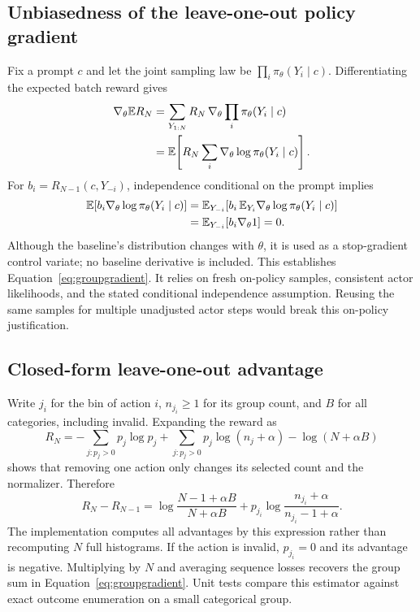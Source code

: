 \subsection{Unbiasedness of the leave-one-out policy gradient}
Fix a prompt $c$ and let the joint sampling law be
$\prod_i\pi_\theta(Y_i\mid c)$. Differentiating the expected batch reward
gives
\begin{align}
 \nabla_\theta\mathbb{E} R_N
 &=\sum_{Y_{1:N}} R_N\,
   \nabla_\theta\prod_i\pi_\theta(Y_i\mid c)\\
 &=\mathbb{E}\!\left[R_N\sum_i\nabla_\theta\log\pi_\theta(Y_i\mid c)\right].
\end{align}
For $b_i=R_{N-1}(c,Y_{-i})$, independence conditional on the prompt implies
\begin{align}
 \mathbb{E}[b_i\nabla_\theta\log\pi_\theta(Y_i\mid c)]
 &=\mathbb{E}_{Y_{-i}}\!\left[b_i\,
       \mathbb{E}_{Y_i}\nabla_\theta\log\pi_\theta(Y_i\mid c)\right]\\
 &=\mathbb{E}_{Y_{-i}}[b_i\nabla_\theta 1]=0.
\end{align}
Although the baseline's distribution changes with $\theta$, it is used as
a stop-gradient control variate; no baseline derivative is included.
This establishes Equation~\eqref{eq:groupgradient}. It relies on fresh
on-policy samples, consistent actor likelihoods, and the stated
conditional independence assumption. Reusing the same samples for multiple
unadjusted actor steps would break this on-policy justification.

\subsection{Closed-form leave-one-out advantage}
Write $j_i$ for the bin of action $i$, $n_{j_i}\geq1$ for its group count,
and $B$ for all categories, including invalid. Expanding the reward as
\begin{equation}
 R_N=-\sum_{j:p_j>0}p_j\log p_j
       +\sum_{j:p_j>0}p_j\log(n_j+\alpha)-\log(N+\alpha B)
\end{equation}
shows that removing one action only changes its selected count and the
normalizer. Therefore
\begin{equation}
 R_N-R_{N-1}=
 \log\frac{N-1+\alpha B}{N+\alpha B}
 +p_{j_i}\log\frac{n_{j_i}+\alpha}{n_{j_i}-1+\alpha}.
 \label{eq:closedadvantage}
\end{equation}
The implementation computes all advantages by this expression rather
than recomputing $N$ full histograms. If the action is invalid,
$p_{j_i}=0$ and its advantage is negative. Multiplying by $N$ and
averaging sequence losses recovers the group sum in
Equation~\eqref{eq:groupgradient}. Unit tests compare this estimator
against exact outcome enumeration on a small categorical group.

